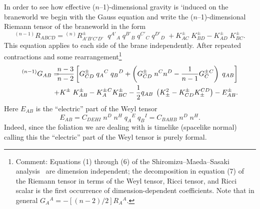 \documentclass[a4paper,10pt]{article}
\begin{document}
{In order to see how effective ($n$--1)-dimensional gravity is `induced
on the braneworld we begin with the Gauss equation and write the
($n$--1)-dimensional Riemann tensor of the braneworld in the
form~\cite{Shiromizu}
% 
\begin{equation}
{}^{(n-1)}R_{ABCD}= 
{}^{(n)}R_{A'B'C'D'}^\pm \; \;
q^{A'}{}_A \;  q^{B'}{}_B \; q^{C'}{}_C \; q^{D'}{}_D \;
+ K_{AC}^\pm\; K_{BD}^\pm - K_{AD}^\pm \; K_{BC}^\pm.
\end{equation}
%
This equation applies to each side of the brane independently.  After
repeated contractions and some rearrangement\footnote{%
Comment: Equations (1) through (6) of the Shiromizu--Maeda--Sasaki
analysis~\cite{Shiromizu} are dimension independent; the decomposition
in equation (7) of the Riemann tensor in terms of the Weyl tensor,
Ricci tensor, and Ricci scalar is the first occurrence of
dimension-dependent coefficients. Note that in general $G_A{}^A =
-[(n-2)/2] R_A{}^A$.}
% 
\begin{eqnarray}
{}^{(n-1)}G_{AB}=
&&\hspace{-6mm}
{n-3\over n-2}\left[
G_{CD}^\pm \; q_A{}^C \; q_B{}^D
+
\left(G_{CD}^\pm \; n^C n^D - {1\over n-1} G^\pm_C{}^C \right) \; q_{AB}
\right]
\nonumber \\
&&\hspace{-6mm}
+K^\pm \; K^\pm_{AB}-K^\pm_{A}{}^{C} K^\pm_{BC} - {1 \over 2}  
q_{AB}\; \left( K_\pm^2- K^\pm_{CD} K_\pm^{CD}\right) -E^\pm_{AB}.
\label{E:brane-einstein-tensor}
\end{eqnarray}
% 
Here $E_{AB}$ is the ``electric'' part of the Weyl tensor
% 
\begin{equation}
E_{AB} = 
C_{DEHI} \; n^D \; n^H \; q_A{}^E \; q_B{}^I =  
C_{BAHB} \; n^D \; n^H.
\end{equation}
%
Indeed, since the foliation we are dealing with is timelike (spacelike
normal) calling this the ``electric'' part of the Weyl tensor is
purely formal.

}
\end{document}
